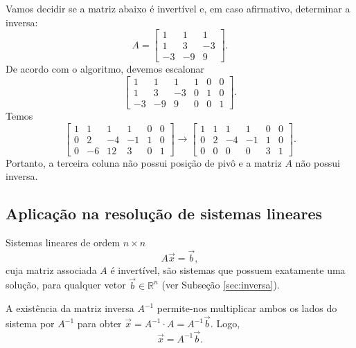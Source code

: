 \begin{ex}
	Vamos decidir se a matriz abaixo é invertível e, em caso afirmativo, determinar a inversa:
	\begin{equation}
	A =
	\left[
	\begin{array}{cccc}
	1 & 1 & 1  \\
	1 & 3 & -3  \\
	-3 & -9 & 9  
	\end{array}
	\right].
	\end{equation} De acordo com o algoritmo, devemos escalonar
	\begin{equation}
	\left[
	\begin{array}{ccc|ccc}
	1 & 1 & 1 & 1 & 0 & 0  \\
	1 & 3 & -3 & 0 & 1 & 0  \\
	-3 & -9 & 9  & 0 & 0 & 1 
	\end{array}
	\right].
	\end{equation} Temos
	\begin{equation}
	\left[
	\begin{array}{ccc|ccc}
	1 & 1 & 1 & 1 & 0 & 0  \\
	0 & 2 & -4 & -1 & 1 & 0  \\
	0 & -6 & 12  & 3 & 0 & 1 
	\end{array}
	\right] \to
	\left[
	\begin{array}{ccc|ccc}
	1 & 1 & 1 & 1 & 0 & 0  \\
	0 & 2 & -4 & -1 & 1 & 0  \\
	0 & 0 & 0  & 0 & 3 & 1 
	\end{array}
	\right].
	\end{equation} Portanto, a terceira coluna não possui posição de pivô e a matriz $A$ não possui inversa.
\end{ex}


\subsection{Aplicação na resolução de sistemas lineares}


Sistemas lineares de ordem $n \times n$
\begin{equation}
A \vec{x} = \vec{b},
\end{equation} cuja matriz associada $A$ é invertível, são sistemas que possuem exatamente uma solução, para qualquer vetor $\vec{b} \in \mathbb{R}^n$ (ver Subseção \ref{sec:inversa}).

A existência da matriz inversa $A^{-1}$ permite-nos multiplicar ambos os lados do sistema por $A^{-1}$ para obter $\vec{x} = A^{-1} \cdot A = A^{-1} \vec{b}.$ Logo,
\begin{equation}
\boxed{\vec{x} = A^{-1} \vec{b}.}
\end{equation}


